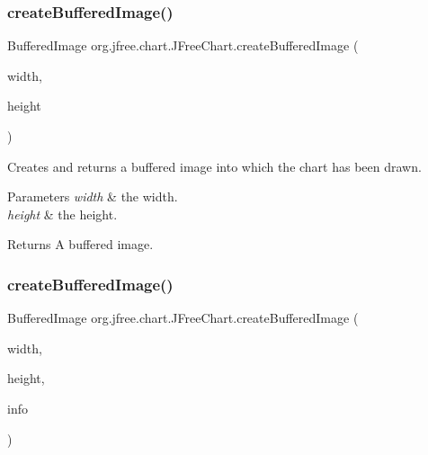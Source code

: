 \subsubsection{\texorpdfstring{create\+Buffered\+Image()}{createBufferedImage()}\hspace{0.1cm}{\footnotesize\ttfamily [1/4]}}
{\footnotesize\ttfamily Buffered\+Image org.\+jfree.\+chart.\+J\+Free\+Chart.\+create\+Buffered\+Image (\begin{DoxyParamCaption}\item[{int}]{width,  }\item[{int}]{height }\end{DoxyParamCaption})}

Creates and returns a buffered image into which the chart has been drawn.


\begin{DoxyParams}{Parameters}
{\em width} & the width. \\
\hline
{\em height} & the height.\\
\hline
\end{DoxyParams}
\begin{DoxyReturn}{Returns}
A buffered image. 
\end{DoxyReturn}
\mbox{\label{classorg_1_1jfree_1_1chart_1_1_j_free_chart_a2938e93cd09e7ba9d1a3f31fc8fc7647}} 
\subsubsection{\texorpdfstring{create\+Buffered\+Image()}{createBufferedImage()}\hspace{0.1cm}{\footnotesize\ttfamily [2/4]}}
{\footnotesize\ttfamily Buffered\+Image org.\+jfree.\+chart.\+J\+Free\+Chart.\+create\+Buffered\+Image (\begin{DoxyParamCaption}\item[{int}]{width,  }\item[{int}]{height,  }\item[{\mbox{\hyperlink{classorg_1_1jfree_1_1chart_1_1_chart_rendering_info}{Chart\+Rendering\+Info}}}]{info }\end{DoxyParamCaption})}

